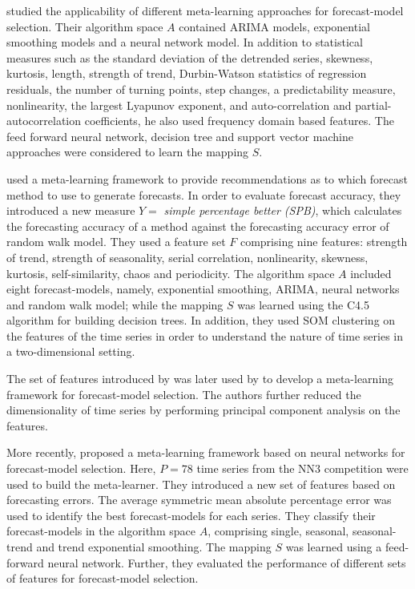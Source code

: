 \documentclass[11pt,a4paper,]{article}
\theoremstyle{definition}
\theoremstyle{definition}
\theoremstyle{definition}
\theoremstyle{remark}
\begin{document}
\textcite{lemke2010meta} studied the applicability of different
meta-learning approaches for forecast-model selection. Their algorithm
space \(A\) contained ARIMA models, exponential smoothing models and a
neural network model. In addition to statistical measures such as the
standard deviation of the detrended series, skewness, kurtosis, length,
strength of trend, Durbin-Watson statistics of regression residuals, the
number of turning points, step changes, a predictability measure,
nonlinearity, the largest Lyapunov exponent, and auto-correlation and
partial-autocorrelation coefficients, he also used frequency domain
based features. The feed forward neural network, decision tree and
support vector machine approaches were considered to learn the mapping
\(S\).

\textcite{wang2009rule} used a meta-learning framework to provide
recommendations as to which forecast method to use to generate
forecasts. In order to evaluate forecast accuracy, they introduced a new
measure \(Y =\) \emph{simple percentage better (SPB)}, which calculates
the forecasting accuracy of a method against the forecasting accuracy
error of random walk model. They used a feature set \(F\) comprising
nine features: strength of trend, strength of seasonality, serial
correlation, nonlinearity, skewness, kurtosis, self-similarity, chaos
and periodicity. The algorithm space \(A\) included eight
forecast-models, namely, exponential smoothing, ARIMA, neural networks
and random walk model; while the mapping \(S\) was learned using the
C4.5 algorithm for building decision trees. In addition, they used SOM
clustering on the features of the time series in order to understand the
nature of time series in a two-dimensional setting.

The set of features introduced by \textcite{wang2009rule} was later used
by \textcite{widodomodel} to develop a meta-learning framework for
forecast-model selection. The authors further reduced the dimensionality
of time series by performing principal component analysis on the
features.

More recently, \textcite{kuck2016meta} proposed a meta-learning
framework based on neural networks for forecast-model selection. Here,
\(P = 78\) time series from the NN3 competition were used to build the
meta-learner. They introduced a new set of features based on forecasting
errors. The average symmetric mean absolute percentage error was used to
identify the best forecast-models for each series. They classify their
forecast-models in the algorithm space \(A\), comprising single,
seasonal, seasonal-trend and trend exponential smoothing. The mapping
\(S\) was learned using a feed-forward neural network. Further, they
evaluated the performance of different sets of features for
forecast-model selection.
\end{document}
